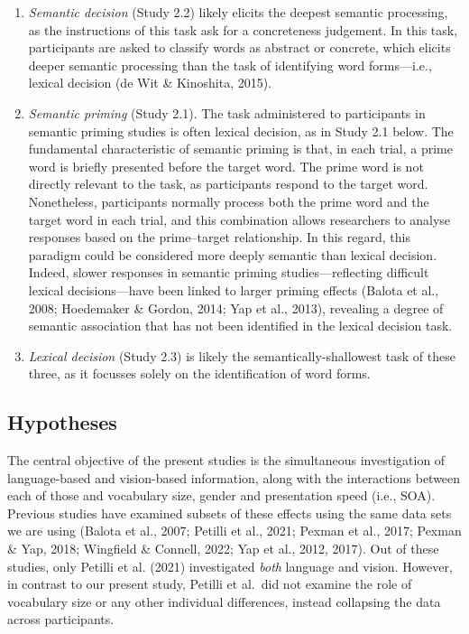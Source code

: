 \documentclass[
  12pt,
  man,floatsintext]{apa7}
\begin{document}
\begin{enumerate}
\def\labelenumi{\arabic{enumi}.}
\item
  \emph{Semantic decision} (Study 2.2) likely elicits the deepest semantic processing, as the instructions of this task ask for a concreteness judgement. In this task, participants are asked to classify words as abstract or concrete, which elicits deeper semantic processing than the task of identifying word forms---i.e., lexical decision (de Wit \& Kinoshita, 2015).
\item
  \emph{Semantic priming} (Study 2.1). The task administered to participants in semantic priming studies is often lexical decision, as in Study 2.1 below. The fundamental characteristic of semantic priming is that, in each trial, a prime word is briefly presented before the target word. The prime word is not directly relevant to the task, as participants respond to the target word. Nonetheless, participants normally process both the prime word and the target word in each trial, and this combination allows researchers to analyse responses based on the prime--target relationship. In this regard, this paradigm could be considered more deeply semantic than lexical decision. Indeed, slower responses in semantic priming studies---reflecting difficult lexical decisions---have been linked to larger priming effects (Balota et al., 2008; Hoedemaker \& Gordon, 2014; Yap et al., 2013), revealing a degree of semantic association that has not been identified in the lexical decision task.
\item
  \emph{Lexical decision} (Study 2.3) is likely the semantically-shallowest task of these three, as it focusses solely on the identification of word forms.
\end{enumerate}

\hypertarget{hypotheses}{%
\subsection{Hypotheses}\label{hypotheses}}

The central objective of the present studies is the simultaneous investigation of language-based and vision-based information, along with the interactions between each of those and vocabulary size, gender and presentation speed (i.e., SOA). Previous studies have examined subsets of these effects using the same data sets we are using (Balota et al., 2007; Petilli et al., 2021; Pexman et al., 2017; Pexman \& Yap, 2018; Wingfield \& Connell, 2022; Yap et al., 2012, 2017). Out of these studies, only Petilli et al. (2021) investigated \emph{both} language and vision. However, in contrast to our present study, Petilli et al.~did not examine the role of vocabulary size or any other individual differences, instead collapsing the data across participants.
\end{document}
